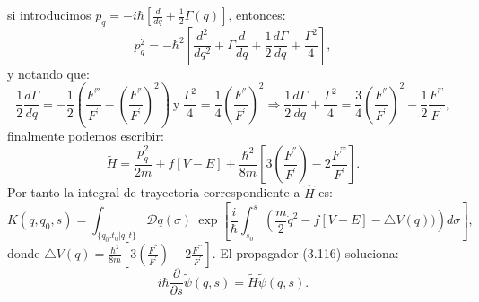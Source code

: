 si introducimos $p_q=-i\hbar\left[\frac{d}{dq}+\frac{1}{2}\Gamma(q)\right]$, entonces:
\begin{equation}
p_{q}^{2}=-\hbar^{2}\left[\frac{d^{2}}{dq^{2}}+\Gamma\frac{d}{dq}+\frac{1}{2}\frac{d\Gamma}{dq}+\frac{\Gamma^{2}}{4}\right],
\end{equation}
y notando que:
\begin{equation}
\frac{1}{2}\frac{d\Gamma}{dq}=-\frac{1}{2}\left(\frac{F^{'''}}{F^{'}}-\left(\frac{F^{''}}{F^{'}}\right)^{2}\right)\ \text{y}\ \frac{\Gamma^{2}}{4}=\frac{1}{4}\left(\frac{F^{''}}{F^{'}}\right)^{2}\Rightarrow\frac{1}{2}\frac{d\Gamma}{dq}+\frac{\Gamma^{2}}{4}
 =\frac{3}{4}\left(\frac{F^{''}}{F^{'}}\right)^{2}-\frac{1}{2}\frac{F^{\text{'''}}}{F^{'}},
\end{equation}
finalmente podemos escribir:
\begin{equation}
\tilde{H}=\frac{p_{q}^{2}}{2m}+f[V-E]+\frac{\hbar^{2}}{8m}\left[3\left(\frac{F^{''}}{F^{'}}\right)-2\frac{F^{\text{'''}}}{F^{'}}\right] .
\end{equation}
Por tanto la integral de trayectoria correspondiente a $\hat{H}$ es:
\begin{equation}
K(q,q_{0},s)=\int_{\{q_{0}.t_{0}|q,t\}}\mathcal{D}q(\sigma)\ \exp\left[\frac{i}{\hbar}\int_{s_{0}}^{s}\left(\frac{m}{2}\dot{q}^{2}-f[V-E]-\triangle V(q))\right)d\sigma\right] ,
\end{equation} 
donde $\triangle V(q)=\frac{\hbar^{2}}{8m}\left[3\left(\frac{F^{''}}{F^{'}}\right)-2\frac{F^{\text{'''}}}{F^{'}}\right]$. El propagador (3.116) soluciona:
\begin{equation}
i\hbar\frac{\partial}{\partial s}\tilde{\psi}(q,s)=\tilde{H}\tilde{\psi}(q,s).
\end{equation}

